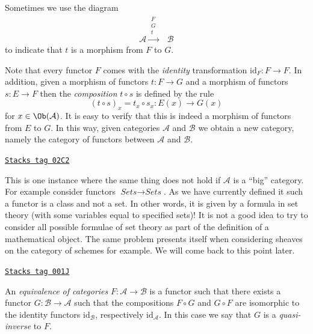 Sometimes we use the diagram
$$
\begin{array}{cc}\mathcal{A}
\xrightarrow{\substack{F\\G\\t}} & \mathcal{B}\end{array}
$$
to indicate that $t$ is a morphism from $F$ to $G$.

\medskip\noindent
Note that every functor $F$ comes with the {\it identity} transformation
$\text{id}_F : F \to F$. In addition, given a morphism of
functors $t : F \to G$ and a morphism of functors $s : E \to F$
then the {\it composition} $t \circ s$ is defined by the rule
$$
(t \circ s)_x = t_x \circ s_x : E(x) \to G(x)
$$
for $x \in \Ob(\mathcal{A})$.
It is easy to verify that this is indeed a morphism of functors
from $E$ to $G$.
In this way, given categories
$\mathcal{A}$ and $\mathcal{B}$ we obtain a new category,
namely the category of functors between $\mathcal{A}$ and
$\mathcal{B}$.

\begin{remark}
\label{categories-remark-functors-sets-sets}
\href{https://stacks.math.columbia.edu/tag/02C2}{\texttt{Stacks tag 02C2}}

This is one instance where the same thing does not hold if
$\mathcal{A}$ is a ``big'' category. For example consider
functors $\textit{Sets} \to \textit{Sets}$. As we have currently
defined it such a functor is a class and not a set. In other
words, it is given by a formula in set theory (with some variables
equal to specified sets)! It is not a good idea to try to consider
all possible formulae of set theory as part of the definition of
a mathematical object. The same problem presents itself when
considering sheaves on the category of schemes for example.
We will come back to this point later.
\end{remark}

\begin{definition}
\label{categories-definition-equivalence-categories}
\href{https://stacks.math.columbia.edu/tag/001J}{\texttt{Stacks tag 001J}}

An {\it equivalence of categories}
$F : \mathcal{A} \to \mathcal{B}$ is a functor such that there
exists a functor $G : \mathcal{B} \to \mathcal{A}$ such that
the compositions $F \circ G$ and $G \circ F$ are isomorphic to the
identity functors $\text{id}_\mathcal{B}$,
respectively $\text{id}_\mathcal{A}$.
In this case we say that $G$ is a {\it quasi-inverse} to $F$.
\end{definition}

